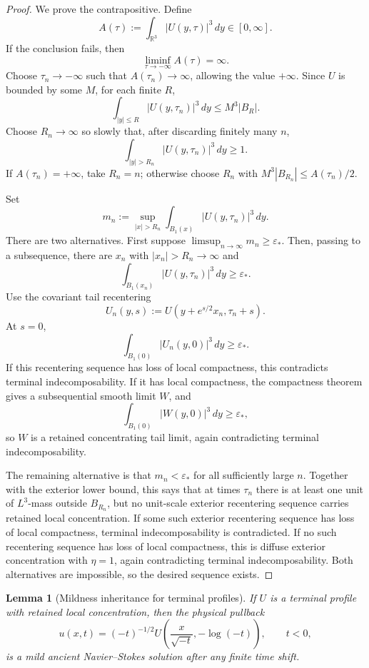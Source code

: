 \documentclass[11pt]{amsart}
\numberwithin{equation}{section}
\theoremstyle{plain}
\newtheorem{lemma}[theorem]{Lemma}
\theoremstyle{definition}
\theoremstyle{remark}
\newcommand{\R}{\mathbb R}
\newcommand{\eps}{\varepsilon}
\begin{document}
\begin{proof}
We prove the contrapositive.  Define
\[
   A(\tau):=\int_{\R^3}|U(y,\tau)|^3\,dy\in[0,\infty].
\]
If the conclusion fails, then
\[
   \liminf_{\tau\to-\infty}A(\tau)=\infty.
\]
Choose \(\tau_n\to-\infty\) such that \(A(\tau_n)\to\infty\), allowing the
value \(+\infty\).  Since \(U\) is bounded by some \(M\), for each finite
\(R\),
\[
   \int_{|y|\le R}|U(y,\tau_n)|^3\,dy\le M^3|B_R|.
\]
Choose \(R_n\to\infty\) so slowly that, after discarding finitely many \(n\),
\[
   \int_{|y|>R_n}|U(y,\tau_n)|^3\,dy\ge1.
\]
If \(A(\tau_n)=+\infty\), take \(R_n=n\); otherwise choose \(R_n\) with
\(M^3|B_{R_n}|\le A(\tau_n)/2\).

Set
\[
   m_n:=\sup_{|x|>R_n}\int_{B_1(x)}|U(y,\tau_n)|^3\,dy .
\]
There are two alternatives.  First suppose
\(\limsup_{n\to\infty}m_n\ge\eps_*\).  Then, passing to a subsequence, there
are \(x_n\) with \(|x_n|>R_n\to\infty\) and
\[
   \int_{B_1(x_n)}|U(y,\tau_n)|^3\,dy\ge\eps_* .
\]
Use the covariant tail recentering
\[
   U_n(y,s):=U(y+e^{s/2}x_n,\tau_n+s).
\]
At \(s=0\),
\[
   \int_{B_1(0)}|U_n(y,0)|^3\,dy\ge\eps_* .
\]
If this recentering sequence has loss of local compactness, this contradicts
terminal indecomposability.  If it has local compactness, the compactness
theorem gives a subsequential smooth
limit \(W\), and
\[
   \int_{B_1(0)}|W(y,0)|^3\,dy\ge\eps_*,
\]
so \(W\) is a retained concentrating tail limit, again contradicting terminal
indecomposability.

The remaining alternative is that \(m_n<\eps_*\) for all sufficiently large
\(n\).  Together with the exterior lower bound, this says that at times
\(\tau_n\) there is at least one unit of \(L^3\)-mass outside \(B_{R_n}\), but
no unit-scale exterior recentering sequence carries retained local
concentration.  If some such exterior recentering sequence has loss of local
compactness, terminal indecomposability is contradicted.  If no such recentering
sequence has loss of local compactness, this is diffuse exterior concentration
with \(\eta=1\), again contradicting terminal indecomposability.  Both
alternatives are impossible, so the desired sequence exists.
\end{proof}

\begin{lemma}[Mildness inheritance for terminal profiles]
\label{hyp:mildness-inheritance-main}
If \(U\) is a terminal profile with retained local concentration, then the physical pullback
\[
   u(x,t)=(-t)^{-1/2}
   U\!\left(\frac{x}{\sqrt{-t}},-\log(-t)\right),
   \qquad t<0,
\]
is a mild ancient Navier--Stokes solution after any finite time shift.
\end{lemma}
\end{document}
